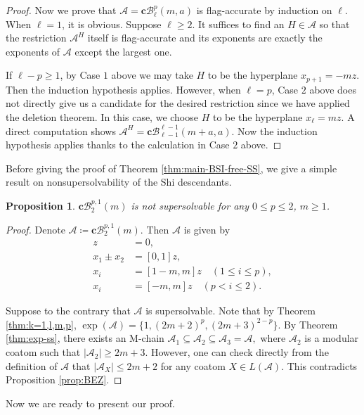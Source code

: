\documentclass[11pt]{article}
\newtheorem{proposition}[theo]{Proposition}
\theoremstyle{definition}
\numberwithin{equation}{section}
\newcommand{\A}{\mathcal{A}}
\newcommand{\B}{\mathcal{B}}
\begin{document}
\begin{proof}
Now we prove that $\A = \textbf{c}\B^p_\ell(m, a)$ is flag-accurate by induction on $\ell$.
When $\ell=1$, it is obvious. Suppose $\ell\ge2$. 
It suffices to find an $H \in \A$ so that the restriction $\A^H$ itself is flag-accurate and its exponents are exactly the exponents of $\A$ except the largest one. 

If $\ell-p\ge 1$, by Case $1$ above we may take $H$ to be the hyperplane $x_{p+1} = -mz$. 
Then the induction hypothesis applies. 
However, when $\ell=p$, Case $2$ above does not  directly give us a candidate for the desired restriction since we have applied the deletion theorem. 
In this case, we choose $H$ to be the hyperplane $x_\ell = mz$. 
A direct computation shows $\A^H= \textbf{c}\B^{\ell-1}_{\ell-1}(m+a, a)$. 
Now the induction hypothesis applies thanks to the calculation in Case $2$ above.
\end{proof}


Before giving the proof of  Theorem \ref{thm:main-BSI-free-SS}, we give a simple result on nonsupersolvability of the Shi descendants.

\begin{proposition}
 \label{prop:nonSS}
$ \mathbf{c}\B^{p,1}_2(m)$ is not supersolvable for any $0 \le p \le 2$, $m\ge1$.
\end{proposition}
\begin{proof}
Denote $\A \coloneqq  \mathbf{c}\B^{p,1}_2(m)$. Then $\A$  is given by 
\begin{align*}
z &= 0 , \\
x_1\pm x_2 &= [0,1]z, \\
x_i&=  [1-m , m]z \quad (1 \leq   i \leq p), \\
x_i&= [-m , m]z   \quad (p<  i \leq 2).
\end{align*}

Suppose to the contrary that $\A$ is  supersolvable. 
Note that by Theorem \ref{thm:k=1,l,m,p}, $\exp(\A) =  \{1, (2m+2)^{p}, (2m+3)^{2-p}\}$. 
By  Theorem \ref{thm:exp-ss}, there exists an M-chain $ \mathcal{A}_{1} \subseteq \mathcal{A}_{2} \subseteq \mathcal{A}_{3} = \A,$ where $\A_2$ is a modular coatom such that $|\A_{2}| \ge 2m+3$. 
However, one can check directly from the definition of $\A$ that $|\A_X| \le 2m+2$  for any coatom $X \in L(\A)$. 
This contradicts Proposition \ref{prop:BEZ}.
\end{proof}

Now we are ready to present our proof.
\end{document}
